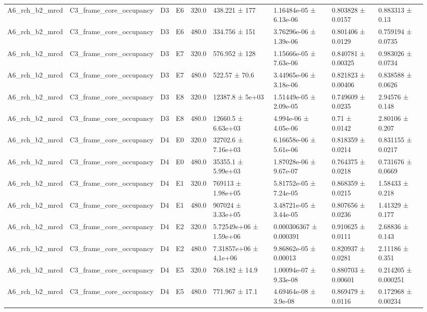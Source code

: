 \begin{table}
\begin{tabular}{lllllllll}
A6\_rch\_b2\_mrcd & C3\_frame\_core\_occupancy & D3 & E6 & 320.0 & 438.221 ± 177 & 1.16484e-05 ± 6.13e-06 & 0.803828 ± 0.0157 & 0.883313 ± 0.13 \\
A6\_rch\_b2\_mrcd & C3\_frame\_core\_occupancy & D3 & E6 & 480.0 & 334.756 ± 151 & 3.76296e-06 ± 1.39e-06 & 0.801406 ± 0.0129 & 0.759194 ± 0.0735 \\
A6\_rch\_b2\_mrcd & C3\_frame\_core\_occupancy & D3 & E7 & 320.0 & 576.952 ± 128 & 1.15666e-05 ± 7.63e-06 & 0.840781 ± 0.00325 & 0.983026 ± 0.0734 \\
A6\_rch\_b2\_mrcd & C3\_frame\_core\_occupancy & D3 & E7 & 480.0 & 522.57 ± 70.6 & 3.44965e-06 ± 3.18e-06 & 0.821823 ± 0.00406 & 0.838588 ± 0.0626 \\
A6\_rch\_b2\_mrcd & C3\_frame\_core\_occupancy & D3 & E8 & 320.0 & 12387.8 ± 5e+03 & 1.51449e-05 ± 2.09e-05 & 0.749609 ± 0.0235 & 2.94576 ± 0.148 \\
A6\_rch\_b2\_mrcd & C3\_frame\_core\_occupancy & D3 & E8 & 480.0 & 12660.5 ± 6.63e+03 & 4.994e-06 ± 4.05e-06 & 0.71 ± 0.0142 & 2.80106 ± 0.207 \\
A6\_rch\_b2\_mrcd & C3\_frame\_core\_occupancy & D4 & E0 & 320.0 & 32702.6 ± 7.16e+03 & 6.16658e-06 ± 5.61e-06 & 0.818359 ± 0.0214 & 0.831155 ± 0.0217 \\
A6\_rch\_b2\_mrcd & C3\_frame\_core\_occupancy & D4 & E0 & 480.0 & 35355.1 ± 5.99e+03 & 1.87028e-06 ± 9.67e-07 & 0.764375 ± 0.0218 & 0.731676 ± 0.0669 \\
A6\_rch\_b2\_mrcd & C3\_frame\_core\_occupancy & D4 & E1 & 320.0 & 769113 ± 1.98e+05 & 5.81752e-05 ± 7.24e-05 & 0.868359 ± 0.0215 & 1.58433 ± 0.218 \\
A6\_rch\_b2\_mrcd & C3\_frame\_core\_occupancy & D4 & E1 & 480.0 & 907024 ± 3.33e+05 & 3.48721e-05 ± 3.44e-05 & 0.807656 ± 0.0236 & 1.41329 ± 0.177 \\
A6\_rch\_b2\_mrcd & C3\_frame\_core\_occupancy & D4 & E2 & 320.0 & 5.72549e+06 ± 1.59e+06 & 0.000306367 ± 0.000391 & 0.910625 ± 0.0111 & 2.68836 ± 0.143 \\
A6\_rch\_b2\_mrcd & C3\_frame\_core\_occupancy & D4 & E2 & 480.0 & 7.31857e+06 ± 4.1e+06 & 9.86862e-05 ± 0.00013 & 0.820937 ± 0.0281 & 2.11186 ± 0.351 \\
A6\_rch\_b2\_mrcd & C3\_frame\_core\_occupancy & D4 & E5 & 320.0 & 768.182 ± 14.9 & 1.00094e-07 ± 9.33e-08 & 0.880703 ± 0.00601 & 0.214205 ± 0.000251 \\
A6\_rch\_b2\_mrcd & C3\_frame\_core\_occupancy & D4 & E5 & 480.0 & 771.967 ± 17.1 & 4.69464e-08 ± 3.9e-08 & 0.869479 ± 0.0116 & 0.172968 ± 0.00234 \\

\end{tabular}
\end{table}
